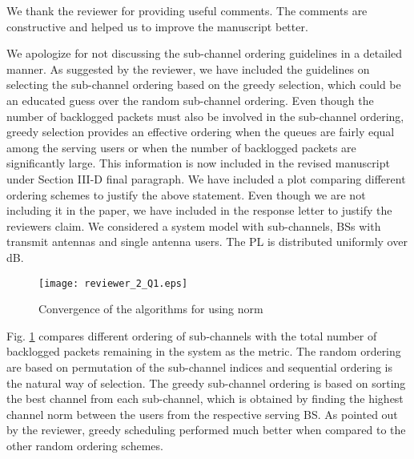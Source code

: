 
\vspace{0.1in}
We thank the reviewer for providing useful comments. The comments are constructive and helped us to improve the manuscript better.

\begin{enumerate}

 

\resp We apologize for not discussing the sub-channel ordering guidelines in a detailed manner. As suggested by the reviewer, we have included the guidelines on selecting the sub-channel ordering based on the greedy selection, which could be an educated guess over the random sub-channel ordering. Even though the number of backlogged packets must also be involved in the sub-channel ordering, greedy selection provides an effective ordering when the queues are fairly equal among the serving users or when the number of backlogged packets are significantly large. This information is now included in the revised manuscript under Section III-D final paragraph. We have included a plot comparing different ordering schemes to justify the above statement. Even though we are not including it in the paper, we have included in the response letter to justify the reviewers claim. We considered a system model with  sub-channels,  \acp{BS} with  transmit antennas and  single antenna users. The \ac{PL} is distributed uniformly over \eqn{[0,-3]} dB.
\begin{figure}[h!]
	\centering
	\texttt{[image: reviewer\_2\_Q1.eps]}
	\caption{Convergence of the algorithms for  using  norm}
	\label{fig-review-1}
\end{figure}

Fig. \ref{fig-review-1} compares different ordering of sub-channels with the total number of backlogged packets remaining in the system as the metric. The random ordering are based on permutation of the sub-channel indices and sequential ordering is the natural way of selection. The greedy sub-channel ordering is based on sorting the best channel from each sub-channel, which is obtained by finding the highest channel norm between the users from the respective serving \ac{BS}. As pointed out by the reviewer, greedy scheduling performed much better when compared to the other random ordering schemes. 	


\end{enumerate}

